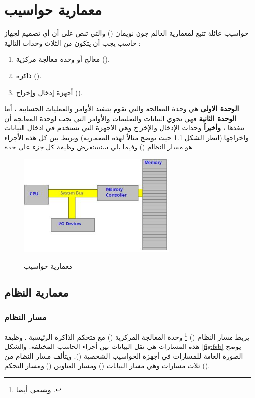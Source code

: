 \documentclass[document.tex]{subfiles}
\begin{document}
\chapter{معمارية حواسيب }
حواسيب عائلة  تتبع لمعمارية العالم جون نويمان () والتي تنص على أن أي تصميم لجهاز حاسب يجب أن يتكون من الثلاث وحدات التالية :
\begin{enumerate}
\item معالج أو وحدة معالجة مركزية ().
\item ذاكرة ().
\item أجهزة إدخال وإخراج ().
\end{enumerate}

\textbf{الوحدة الاولى} هي وحدة المعالجة والتي تقوم بتنفيذ الأوامر والعمليات الحسابية ، أما \textbf{الوحدة الثانية} فهي تحوي البيانات والتعليمات والأوامر التي يجب لوحدة المعالجة أن تنفذها ، \textbf{وأخيراً} وحدات الإدخال والإخراج وهي الاجهزة التي تستخدم في ادخال البيانات واخراجها.(انظر الشكل \ref{fig:vonarch} حيث يوضح مثالاً لهذه المعمارية) ويربط بين كل هذه الأجزاء هو مسار النظام () وفيما يلي سنستعرض وظيفة كل جزء على حدة.

\begin{figure}[h!]
  \caption{معمارية حواسيب }
  \centering
   \includegraphics[width=0.7\textwidth]{../img/vonarch}
 \label{fig:vonarch} 
\end{figure}

\section{معمارية النظام}
\subsection{مسار النظام }
يربط مسار النظام () \footnote{ويسمى أيضا .} وحدة المعالجة المركزية () مع متحكم الذاكرة الرئيسية . وظيفة هذه المسارات هي نقل البيانات بين أجزاء الحاسب المختلفة. والشكل \ref{fig:fsb} يوضح الصورة العامة للمسارات في أجهزة الحواسيب الشخصية (). ويتألف مسار النظام من ثلاث مسارات وهي مسار البيانات () ومسار العناوين () ومسار التحكم ().
\end{document}
